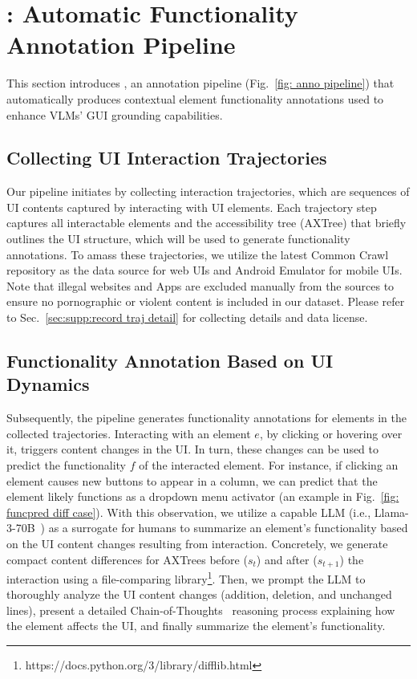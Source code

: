 \section{\methodname{}: Automatic Functionality Annotation Pipeline}
\label{sec: annotation pipeline}
This section introduces \methodname{}, an annotation pipeline (Fig.~\ref{fig: anno pipeline}) that automatically produces contextual element functionality annotations used to enhance VLMs' GUI grounding capabilities.






\subsection{Collecting UI Interaction Trajectories}
Our pipeline initiates by collecting interaction trajectories, which are sequences of UI contents captured by interacting with UI elements. Each trajectory step captures all interactable elements and the accessibility tree (AXTree) that briefly outlines the UI structure, which will be used to generate functionality annotations. To amass these trajectories, we utilize the latest Common Crawl repository as the data source for web UIs and Android Emulator for mobile UIs. Note that illegal websites and Apps are excluded manually from the sources to ensure no pornographic or violent content is included in our dataset. Please refer to Sec.~\ref{sec:supp:record traj detail} for collecting details and data license.

\subsection{Functionality Annotation Based on UI Dynamics}
Subsequently, the pipeline generates functionality annotations for elements in the collected trajectories. Interacting with an element $e$, by clicking or hovering over it, triggers content changes in the UI. In turn, these changes can be used to predict the functionality $f$ of the interacted element. For instance, if clicking an element causes new buttons to appear in a column, we can predict that the element likely functions as a dropdown menu activator (an example in Fig.~\ref{fig: funcpred diff case}).
With this observation, we utilize a capable LLM (i.e., Llama-3-70B~\citep{llama3modelcard}) as a surrogate for humans to summarize an element's functionality based on the UI content changes resulting from interaction. Concretely, we generate compact content differences for AXTrees before ($s_t$) and after ($s_{t+1}$) the interaction using a file-comparing library\footnote{https://docs.python.org/3/library/difflib.html}. Then, we prompt the LLM to thoroughly analyze the UI content changes (addition, deletion, and unchanged lines), present a detailed Chain-of-Thoughts~\citep{wei2022chain} reasoning process explaining how the element affects the UI, and finally summarize the element's functionality.

